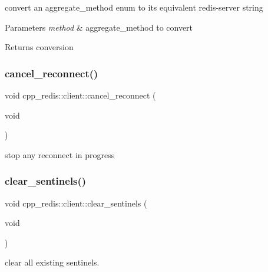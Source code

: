 convert an aggregate\+\_\+method enum to its equivalent redis-\/server string


\begin{DoxyParams}{Parameters}
{\em method} & aggregate\+\_\+method to convert \\
\hline
\end{DoxyParams}
\begin{DoxyReturn}{Returns}
conversion 
\end{DoxyReturn}
\mbox{\label{classcpp__redis_1_1client_adb605a877f65b8f54725576b45aeeca6}} 
\subsubsection{\texorpdfstring{cancel\+\_\+reconnect()}{cancel\_reconnect()}}
{\footnotesize\ttfamily void cpp\+\_\+redis\+::client\+::cancel\+\_\+reconnect (\begin{DoxyParamCaption}\item[{void}]{ }\end{DoxyParamCaption})}

stop any reconnect in progress \mbox{\label{classcpp__redis_1_1client_a68cd15d1cc30302237e3a400e2ac43f5}} 
\subsubsection{\texorpdfstring{clear\+\_\+sentinels()}{clear\_sentinels()}}
{\footnotesize\ttfamily void cpp\+\_\+redis\+::client\+::clear\+\_\+sentinels (\begin{DoxyParamCaption}\item[{void}]{ }\end{DoxyParamCaption})}

clear all existing sentinels. \mbox{\label{classcpp__redis_1_1client_ae4090830d1710276c33ff5a74eba2e4b}} 
